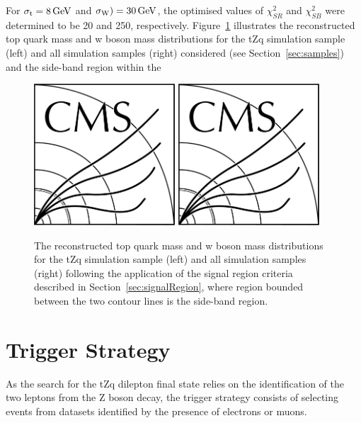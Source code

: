 For $\sigma_{\mathrm{t}} = 8\,\text{Ge\hspace{-.08em}V}$ and $\sigma_{\mathrm{W}}) = 30\,\text{Ge\hspace{-.08em}V}$, the optimised values of $\chi^{2}_{SR}$ and $\chi^{2}_{SB}$ were determined to be 20 and 250, respectively.
Figure~\ref{fig:blindingChi2} illustrates the reconstructed top quark mass and w boson mass distributions for the tZq simulation sample (left) and all simulation samples (right) considered (see Section~\ref{sec:samples}) and the side-band region within the

\begin{figure}[tbp]
\centering
\includegraphics[width=0.47\textwidth]{CMS-bw-logo.pdf}
\includegraphics[width=0.47\textwidth]{CMS-bw-logo.pdf}
\caption{
The reconstructed top quark mass and w boson mass distributions for the tZq simulation sample (left) and all simulation samples (right) following the application of the signal region criteria described in Section~\ref{sec:signalRegion}, where region bounded between the two contour lines is the side-band region.
}
\label{fig:blindingChi2}
\end{figure}

\section{Trigger Strategy}\label{sec:triggerStrategy}
As the search for the tZq dilepton final state relies on the identification of the two leptons from the Z boson decay, the trigger strategy consists of selecting events from datasets identified by the presence of electrons or muons.


